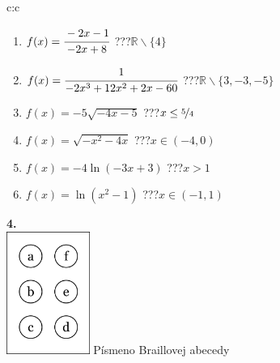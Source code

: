 \documentclass[10pt]{report}
\begin{document}
\begin{tabular}{c:c}
\begin{minipage}[c][104.5mm][t]{0.5\linewidth}
\begin{center}
\begin{minipage}{0.79\linewidth}
\begin{center}
\begin{varwidth}{\linewidth}
\begin{enumerate}
\normalsizerrr
\item $f(x)=\cfrac{-2x-1}{-2x+8}$\quad \dotfill\; ???\;\dotfill \quad $\mathbb{R}\smallsetminus\{4\}$
\item $f(x)=\cfrac{1}{-2x^3+12x^2+2x-60}$\quad \dotfill\; ???\;\dotfill \quad $\mathbb{R}\smallsetminus\{3,-3,-5\}$
\item $f(x)=-5\sqrt{-4x-5}$\quad \dotfill\; ???\;\dotfill \quad $x\leq\nicefrac{5}{4}$
\item $f(x)=\sqrt{-x^2-4x}$\quad \dotfill\; ???\;\dotfill \quad $x\in(-4 , 0)$
\item $f(x)=-4\ln{(-3x+3)}$\quad \dotfill\; ???\;\dotfill \quad $x>1$
\item $f(x)=\ln{(x^2-1)}$\quad \dotfill\; ???\;\dotfill \quad $x\in(-1 , 1)$
\end{enumerate}
\end{varwidth}
\end{center}
\end{minipage}
\begin{minipage}{0.20\linewidth}
\begin{center}
{\Huge\bfseries 4.} \\[2mm]
\includegraphics[height=40mm]{../images/braille.png}
{\small Písmeno Braillovej abecedy}
\end{center}
\end{minipage}
\end{center}
\end{minipage}
%
\end{tabular}
\newpage
\thispagestyle{empty}
\end{document}
